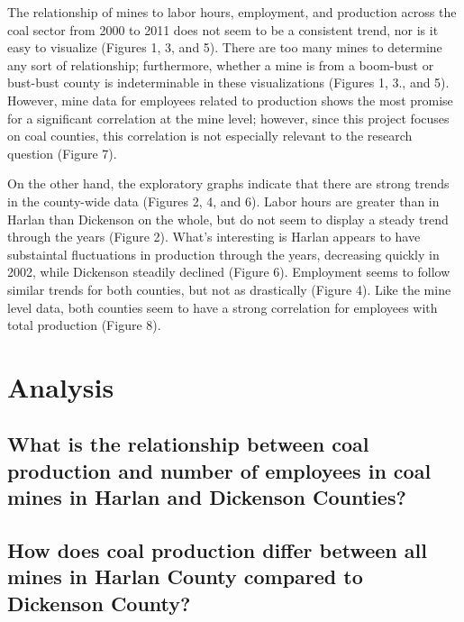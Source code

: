 \documentclass[12pt,]{article}
\begin{document}
The relationship of mines to labor hours, employment, and production
across the coal sector from 2000 to 2011 does not seem to be a
consistent trend, nor is it easy to visualize (Figures 1, 3, and 5).
There are too many mines to determine any sort of relationship;
furthermore, whether a mine is from a boom-bust or bust-bust county is
indeterminable in these visualizations (Figures 1, 3., and 5). However,
mine data for employees related to production shows the most promise for
a significant correlation at the mine level; however, since this project
focuses on coal counties, this correlation is not especially relevant to
the research question (Figure 7).

On the other hand, the exploratory graphs indicate that there are strong
trends in the county-wide data (Figures 2, 4, and 6). Labor hours are
greater than in Harlan than Dickenson on the whole, but do not seem to
display a steady trend through the years (Figure 2). What's interesting
is Harlan appears to have substaintal fluctuations in production through
the years, decreasing quickly in 2002, while Dickenson steadily declined
(Figure 6). Employment seems to follow similar trends for both counties,
but not as drastically (Figure 4). Like the mine level data, both
counties seem to have a strong correlation for employees with total
production (Figure 8).

\newpage

\hypertarget{analysis}{%
\section{Analysis}\label{analysis}}

\hypertarget{what-is-the-relationship-between-coal-production-and-number-of-employees-in-coal-mines-in-harlan-and-dickenson-counties}{%
\subsection{What is the relationship between coal production and number
of employees in coal mines in Harlan and Dickenson
Counties?}\label{what-is-the-relationship-between-coal-production-and-number-of-employees-in-coal-mines-in-harlan-and-dickenson-counties}}

\hypertarget{how-does-coal-production-differ-between-all-mines-in-harlan-county-compared-to-dickenson-county}{%
\subsection{How does coal production differ between all mines in Harlan
County compared to Dickenson
County?}\label{how-does-coal-production-differ-between-all-mines-in-harlan-county-compared-to-dickenson-county}}
\end{document}
